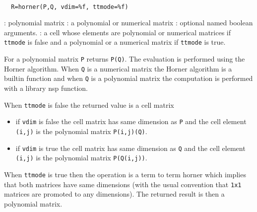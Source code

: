 \begin{mandesc}
   \\ %
\end{mandesc}
\begin{calling_sequence}
\begin{verbatim}
  R=horner(P,Q, vdim=%f, ttmode=%f)
\end{verbatim}
\end{calling_sequence}
\begin{parameters}
  \begin{varlist}
    : polynomial matrix
    : a polynomial or numerical matrix
    : optional named boolean arguments.
    : a cell whose elements are  polynomial or numerical matrices 
    if \verb!ttmode! is false and a  polynomial or a numerical matrix if 
    \verb!ttmode! is true.
  \end{varlist}
\end{parameters}
\begin{mandescription}
  For a polynomial matrix \verb!P! returns \verb!P(Q)!. The evaluation 
  is performed using the Horner algorithm. When \verb!Q! is a 
  numerical matrix the Horner algorithm is a builtin function 
  and when \verb!Q! is a  polynomial matrix the computation is 
  performed with a library nsp function. 
  
  When \verb!ttmode! is false the returned value is a cell matrix 
  \begin{itemize}
    \item if \verb!vdim! is false the cell matrix has same dimension 
      as \verb!P! and the cell element \verb!(i,j)! is the polynomial
      matrix \verb!P(i,j)(Q)!. 
    \item if \verb!vdim! is true the cell matrix has same dimension 
      as \verb!Q! and the cell element \verb!(i,j)! is the polynomial
      matrix \verb!P(Q(i,j))!.
  \end{itemize}
  
  When \verb!ttmode! is true then the operation is a term to term 
  horner which implies that both matrices have same dimensions (with 
  the usual convention that \verb!1x1! matrices are promoted 
  to any dimensions).  The returned result is then a polynomial matrix. 
  
\end{mandescription}
